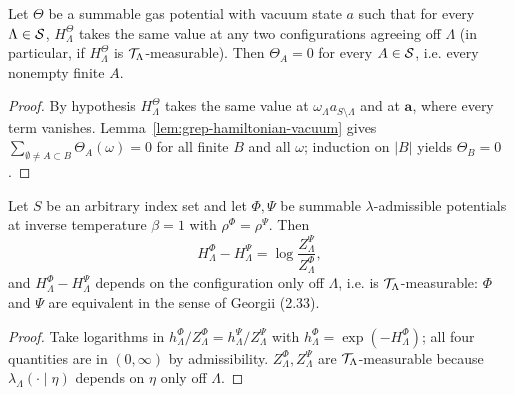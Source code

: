 \begin{theorem}[Georgii (2.35)(a) for $\alpha = \delta_a$]
    \label{thm:grep-gas-potential-vanishes}
    \leanok

    Let $\Theta$ be a summable gas potential with vacuum state $a$ such that for every
    $\Lambda \in \mathcal{S}$, $H^\Theta_\Lambda$ takes the same value at any two configurations
    agreeing off $\Lambda$ (in particular, if $H^\Theta_\Lambda$ is $\mathcal{T}_\Lambda$-measurable).
    Then $\Theta_A = 0$ for every $A \in \mathcal{S}$, i.e. every nonempty finite $A$.
\end{theorem}
\begin{proof}
    \leanok

    By hypothesis $H^\Theta_\Lambda$ takes the same value at
    $\omega_\Lambda a_{S \setminus \Lambda}$ and at $\mathbf a$, where every term vanishes.
    Lemma~\ref{lem:grep-hamiltonian-vacuum} gives
    $\sum_{\emptyset \neq A \subset B} \Theta_A(\omega) = 0$ for all finite $B$ and all $\omega$;
    induction on $|B|$ yields $\Theta_B = 0$.
\end{proof}

\begin{proposition}
    \label{prop:grep-2-34-ii-i}
    \leanok

    Let $S$ be an arbitrary index set and let $\Phi,\Psi$ be summable $\lambda$-admissible
    potentials at inverse temperature $\beta = 1$ with $\rho^\Phi = \rho^\Psi$.  Then
    \[
        H^\Phi_\Lambda - H^\Psi_\Lambda = \log \frac{Z^\Psi_\Lambda}{Z^\Phi_\Lambda},
    \]
    and $H^\Phi_\Lambda - H^\Psi_\Lambda$ depends on the configuration only off $\Lambda$, i.e. is
    $\mathcal{T}_\Lambda$-measurable: $\Phi$ and $\Psi$ are equivalent in the sense of Georgii (2.33).
\end{proposition}
\begin{proof}
    \leanok

    Take logarithms in $h^\Phi_\Lambda / Z^\Phi_\Lambda = h^\Psi_\Lambda / Z^\Psi_\Lambda$ with
    $h^\Phi_\Lambda = \exp(-H^\Phi_\Lambda)$; all four quantities are in $(0,\infty)$ by
    admissibility.  $Z^\Phi_\Lambda, Z^\Psi_\Lambda$ are $\mathcal{T}_\Lambda$-measurable because
    $\lambda_\Lambda(\cdot \mid \eta)$ depends on $\eta$ only off $\Lambda$.
\end{proof}

